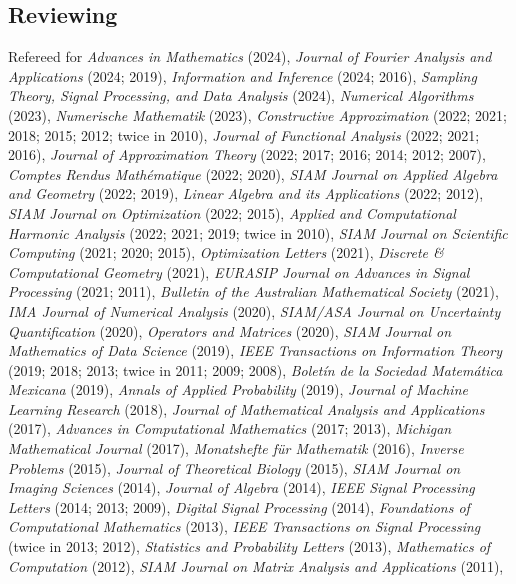 \documentclass[11pt]{article}
\begin{document}
\subsection{Reviewing}
\bitemize
\item Refereed for 
{\sl Advances in Mathematics} (2024),
{\sl Journal of Fourier Analysis and Applications} (2024; 2019),
{\sl Information and Inference} (2024; 2016),
{\sl Sampling Theory, Signal Processing, and Data Analysis} (2024),
{\sl Numerical Algorithms} (2023),
{\sl Numerische Mathematik} (2023),
{\sl Constructive Approximation} (2022; 2021; 2018; 2015; 2012; twice in 2010),
{\sl Journal of Functional Analysis} (2022; 2021; 2016),
{\sl Journal of Approximation Theory} (2022; 2017; 2016; 2014; 2012; 2007),
{\sl Comptes Rendus Math\'ematique} (2022; 2020),
{\sl SIAM Journal on Applied Algebra and Geometry} (2022; 2019),
{\sl Linear Algebra and its Applications} (2022; 2012),
{\sl SIAM Journal on Optimization} (2022; 2015),
{\sl Applied and Computational Harmonic Analysis} (2022; 2021; 2019; twice in 2010),
{\sl SIAM Journal on Scientific Computing} (2021; 2020; 2015),
{\sl Optimization Letters} (2021),
{\sl Discrete \& Computational Geometry} (2021),
{\sl EURASIP Journal on Advances in Signal Processing} (2021; 2011),
{\sl Bulletin of the Australian Mathematical Society} (2021),
{\sl IMA Journal of Numerical Analysis} (2020),
{\sl SIAM/ASA Journal on Uncertainty Quantification} (2020),
{\sl Operators and Matrices} (2020),
{\sl SIAM Journal on Mathematics of Data Science} (2019),
{\sl IEEE Transactions on Information Theory} (2019; 2018; 2013; twice in 2011; 2009; 2008),
{\sl Bolet\'in de la Sociedad Matem\'atica Mexicana} (2019),
{\sl Annals of Applied Probability} (2019),
{\sl Journal of Machine Learning Research} (2018),
{\sl Journal of Mathematical Analysis and Applications} (2017),
{\sl Advances in Computational Mathematics} (2017; 2013),
{\sl Michigan Mathematical Journal} (2017),
{\sl Monatshefte f\"ur Mathematik} (2016),
{\sl Inverse Problems} (2015),
{\sl Journal of Theoretical Biology} (2015),
{\sl SIAM Journal on Imaging Sciences} (2014),
{\sl Journal of Algebra} (2014),
{\sl IEEE Signal Processing Letters} (2014; 2013; 2009),
{\sl Digital Signal Processing} (2014),
{\sl \mbox{Foundations} of Computational Mathematics} (2013),
{\sl IEEE Transactions on Signal Processing} (twice in 2013; 2012), 
{\sl Statistics and Probability Letters} (2013),
{\sl Mathematics of Computation} (2012),
{\sl SIAM Journal on Matrix Analysis and Applications} (2011),
\end{document}
